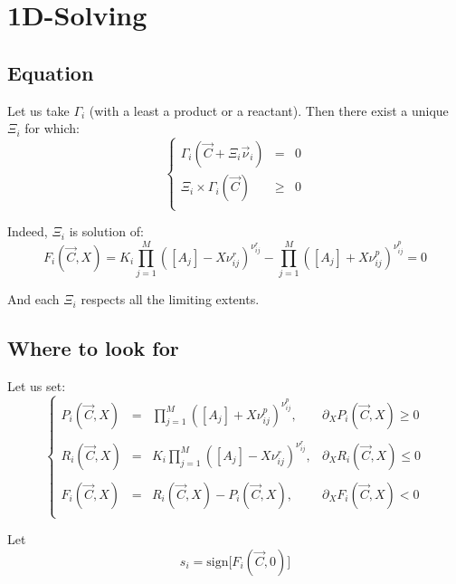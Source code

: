 \documentclass[aps,12pt]{revtex4}
\begin{document}
\section{1D-Solving}

\subsection{Equation}
Let us take $\Gamma_i$ (with a least a product or a reactant).
Then there exist a unique $\Xi_i$ for which:
\begin{equation}
\left\lbrace
\begin{array}{rcl}
	\Gamma_i(\vec{C} + \Xi_i \vec{\nu}_i ) & = & 0\\
	 \Xi_i \times \Gamma_i(\vec{C}) &\geq  &0\\
\end{array}
\right.
\end{equation}
 
Indeed, $\Xi_i$ is solution of:
\begin{equation}
	 F_i(\vec{C},X) =  K_i \prod_{j=1}^{M} \left([A_j] - X \nu^r_{ij}\right)^{\nu^r_{ij}} 
	- \prod_{j=1}^{M} \left([A_j] + X \nu^p_{ij} \right)^{\nu^p_{ij}} = 0
\end{equation} 

And each $\Xi_i$ respects all the limiting extents.

\subsection{Where to look for}
Let us set:
\begin{equation}
\left\lbrace
\begin{array}{rcll}
	P_i(\vec{C},X) & = & \displaystyle \prod_{j=1}^{M} \left([A_j] + X \nu^p_{ij} \right)^{\nu^p_{ij}}, & \partial_X P_i(\vec{C},X) \geq 0 \\
	\\
	R_i(\vec{C},X) & = & \displaystyle K_i \prod_{j=1}^{M} \left([A_j] - X \nu^r_{ij}\right)^{\nu^r_{ij}}, & \partial_X R_i(\vec{C},X) \leq 0 \\
	\\
	 F_i(\vec{C},X) & = & R_i(\vec{C},X)  - P_i(\vec{C},X), & \partial_X F_i(\vec{C},X) < 0\\
\end{array}
\right.
\end{equation}

Let
\begin{equation}
	s_i = \mathrm{sign}\lbrack F_i(\vec{C},0) \rbrack
\end{equation}
\end{document}
